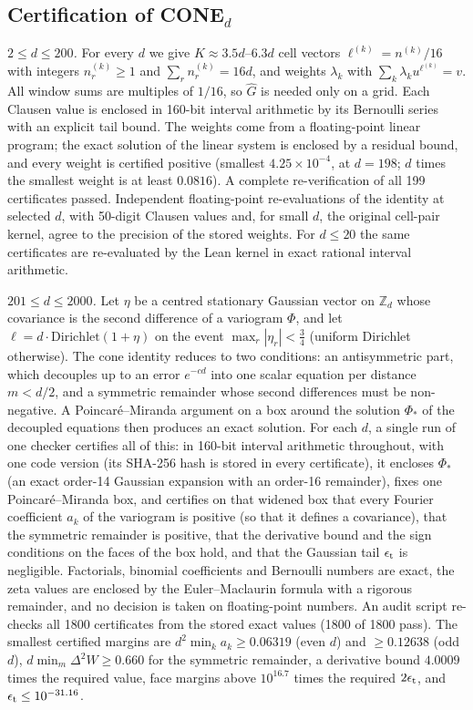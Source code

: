\documentclass[11pt]{article}
\newcommand{\Z}{\mathbb{Z}}
\begin{document}
\subsection*{Certification of CONE$_d$}
\emph{$2\le d\le200$.} For every $d$ we give $K\approx3.5d$--$6.3d$ cell vectors $\ell^{(k)}=n^{(k)}/16$ with integers
$n^{(k)}_r\ge1$ and $\sum_rn^{(k)}_r=16d$, and weights $\lambda_k$ with $\sum_k\lambda_ku^{\ell^{(k)}}=v$. All window
sums are multiples of $1/16$, so $\hat G$ is needed only on a grid. Each Clausen value is enclosed in 160-bit interval
arithmetic\cite{mpmath,Tucker2011} by its Bernoulli series with an explicit tail bound. The weights come from a
floating-point linear program\cite{HiGHS2018}; the exact solution of the linear system is enclosed by a residual bound,
and every weight is certified positive (smallest $4.25\times10^{-4}$, at $d=198$; $d$ times the smallest weight is at
least $0.0816$). A complete re-verification of all 199 certificates passed. Independent floating-point re-evaluations
of the identity at selected $d$, with 50-digit Clausen values and, for small $d$, the original cell-pair kernel, agree
to the precision of the stored weights. For $d\le20$ the same certificates are re-evaluated by the Lean kernel in exact
rational interval arithmetic.

\emph{$201\le d\le2000$.} Let $\eta$ be a centred stationary Gaussian vector on $\Z_d$ whose covariance is the second
difference of a variogram $\Phi$, and let $\ell=d\cdot\mathrm{Dirichlet}(1+\eta)$ on the event $\max_r|\eta_r|<\frac34$
(uniform Dirichlet otherwise). The cone identity reduces to two conditions: an antisymmetric part, which decouples up to
an error $e^{-cd}$ into one scalar equation per distance $m<d/2$, and a symmetric remainder whose second differences
must be non-negative. A Poincar\'e--Miranda argument on a box around the solution $\Phi_*$ of the decoupled equations
then produces an exact solution. For each $d$, a single run of one checker certifies all of this: in 160-bit interval
arithmetic throughout, with one code version (its SHA-256 hash is stored in every certificate), it encloses $\Phi_*$
(an exact order-14 Gaussian expansion with an order-16 remainder), fixes one Poincar\'e--Miranda box, and certifies on
that widened box that every Fourier coefficient $a_k$ of the variogram is positive (so that it defines a covariance),
that the symmetric remainder is positive, that the derivative bound and the sign conditions on the faces of the box
hold, and that the Gaussian tail $\epsilon_{\rm t}$ is negligible. Factorials, binomial coefficients and Bernoulli
numbers are exact, the zeta values are enclosed by the Euler--Maclaurin formula with a rigorous remainder, and no
decision is taken on floating-point numbers. An audit script re-checks all 1800 certificates from the stored exact
values (1800 of 1800 pass). The smallest certified margins are $d^2\min_ka_k\ge0.06319$ (even $d$) and $\ge0.12638$
(odd $d$), $d\min_m\Delta^2W\ge0.660$ for the symmetric remainder, a derivative bound $4.0009$ times the required value,
face margins above $10^{16.7}$ times the required $2\epsilon_{\rm t}$, and $\epsilon_{\rm t}\le10^{-31.16}$.
\end{document}
